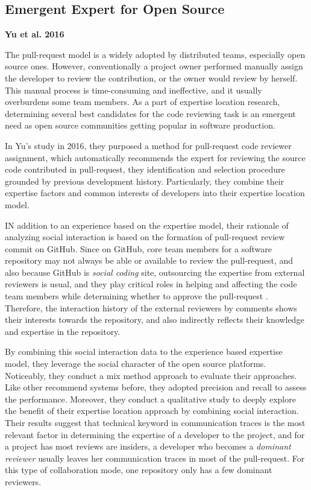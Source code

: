 \subsection{Emergent Expert for Open Source}

\textbf{Yu et al. 2016}

The pull-request model is a widely adopted by distributed teams, especially open source ones. However, conventionally a project owner performed manually assign the developer to review the contribution, or the owner would review by herself. This manual process is time-consuming and ineffective, and it usually overburdens some team members. As a part of expertise location research, determining several best candidates for the code reviewing task is an emergent need as open source communities getting popular in software production.

In Yu's study in 2016, they purposed a method for pull-request code reviewer assignment, which automatically recommends the expert for reviewing the source code contributed in pull-request, they identification and selection procedure grounded by previous development history. Particularly, they combine their expertise factors and common interests of developers into their expertise location model.

IN addition to an experience based on the expertise model, their rationale of analyzing social interaction is based on the formation of pull-request review commit on GitHub. Since on GitHub, core team members for a software repository may not always be able or available to review the pull-request, and also because GitHub is \textit{social coding} site, outsourcing the expertise from external reviewers is usual, and they play critical roles in helping and affecting the code team members while determining whether to approve the pull-request \cite{tsay2014let}. Therefore, the interaction history of the external reviewers by comments shows their interests towards the repository, and also indirectly reflects their knowledge and expertise in the repository.

By combining this social interaction data to the experience based expertise model, they leverage the social character of the open source platforms. Noticeably, they conduct a mix method approach to evaluate their approaches. Like other recommend systems before, they adopted precision and recall to assess the performance. Moreover, they conduct a qualitative study to deeply explore the benefit of their expertise location approach by combining social interaction. Their results suggest that technical keyword in communication traces is the most relevant factor in determining the expertise of a developer to the project, and for a project has most reviews are insiders, a developer who becomes a \textit{dominant reviewer} usually leaves her communication traces in most of the pull-request. For this type of collaboration mode, one repository only has a few dominant reviewers.

